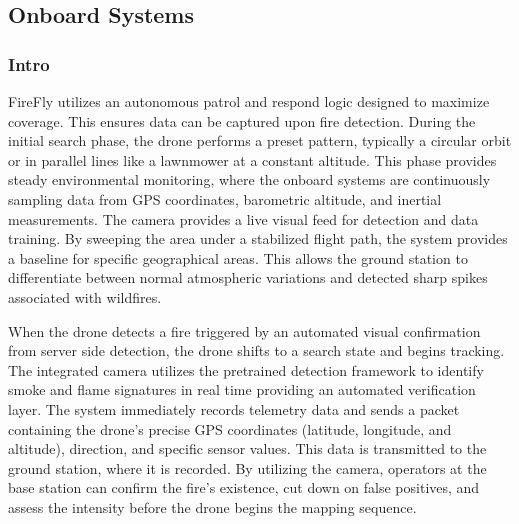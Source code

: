 \documentclass[journal, onecolumn]{IEEEtran}
\begin{document}
\vspace{1em}

\subsection{Onboard Systems}
\subsubsection{Intro}
FireFly utilizes an autonomous patrol and respond logic designed to maximize coverage. This ensures data can be captured upon fire detection. During the initial search phase, the drone performs a preset pattern, typically a circular orbit or in parallel lines like a lawnmower at a constant altitude. This phase provides steady environmental monitoring, where the onboard systems are continuously sampling data from GPS coordinates, barometric altitude, and inertial measurements. The camera provides a live visual feed for detection and data training. By sweeping the area under a stabilized flight path, the system provides a baseline for specific geographical areas. This allows the ground station to differentiate between normal atmospheric variations and detected sharp spikes associated with wildfires.

\vspace{0.5em}

When the drone detects a fire triggered by an automated visual confirmation from server side detection, the drone shifts to a search state and begins tracking. The integrated camera utilizes the pretrained detection framework to identify smoke and flame signatures in real time providing an automated verification layer. The system immediately records telemetry data and sends a packet containing the drone's precise GPS coordinates (latitude, longitude, and altitude), direction, and specific sensor values. This data is transmitted to the ground station, where it is recorded. By utilizing the camera, operators at the base station can confirm the fire's existence, cut down on false positives, and assess the intensity before the drone begins the mapping sequence. 

\vspace{0.5em}
\end{document}
